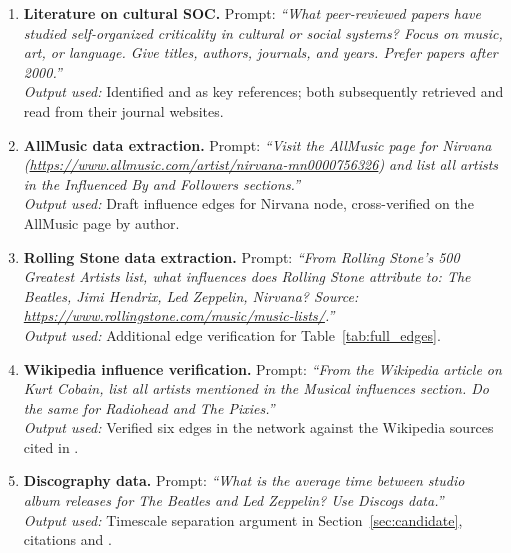 \documentclass[12pt, a4paper]{article}
\begin{document}
\begin{enumerate}[label=\textbf{G\arabic*.}, leftmargin=*, itemsep=6pt]

  \item \textbf{Literature on cultural SOC.}
  Prompt: \textit{``What peer-reviewed papers have studied
  self-organized criticality in cultural or social systems?
  Focus on music, art, or language. Give titles, authors,
  journals, and years. Prefer papers after 2000.''}\\
  \textit{Output used:} Identified \citet{mauch2015} and
  \citet{salganik2006} as key references; both subsequently
  retrieved and read from their journal websites.

  \item \textbf{AllMusic data extraction.}
  Prompt: \textit{``Visit the AllMusic page for Nirvana
  (\url{https://www.allmusic.com/artist/nirvana-mn0000756326})
  and list all artists in the Influenced By and Followers
  sections.''}\\
  \textit{Output used:} Draft influence edges for Nirvana node,
  cross-verified on the AllMusic page by author.

  \item \textbf{Rolling Stone data extraction.}
  Prompt: \textit{``From Rolling Stone's 500 Greatest Artists
  list, what influences does Rolling Stone attribute to:
  The Beatles, Jimi Hendrix, Led Zeppelin, Nirvana?
  Source:
  \url{https://www.rollingstone.com/music/music-lists/}.''}\\
  \textit{Output used:} Additional edge verification for
  Table~\ref{tab:full_edges}.

  \item \textbf{Wikipedia influence verification.}
  Prompt: \textit{``From the Wikipedia article on Kurt Cobain,
  list all artists mentioned in the Musical influences section.
  Do the same for Radiohead and The Pixies.''}\\
  \textit{Output used:} Verified six edges in the network
  against the Wikipedia sources cited in
  \citet{wikifluence2024}.

  \item \textbf{Discography data.}
  Prompt: \textit{``What is the average time between studio
  album releases for The Beatles and Led Zeppelin?
  Use Discogs data.''}\\
  \textit{Output used:} Timescale separation argument in
  Section~\ref{sec:candidate}, citations
  \citet{discogsbeatles} and \citet{discogsledzep}.


\end{enumerate}
\end{document}
